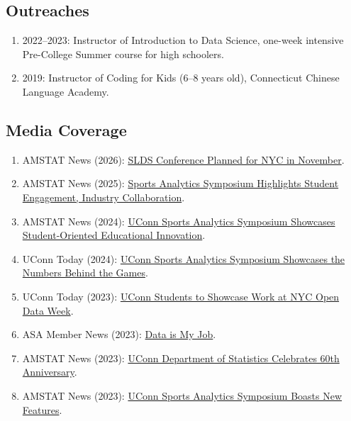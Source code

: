 \documentclass[Statistics]{vita}
\begin{document}
\begin{vita}
  \subsection{Outreaches}
  \begin{enumerate}
  \item 2022--2023: Instructor of Introduction to Data Science, one-week intensive Pre-College Summer course for high schoolers.
  \item 2019: Instructor of Coding for Kids (6--8 years old), Connecticut  Chinese Language Academy.
  \end{enumerate}
  \subsection{Media Coverage}
  \begin{enumerate}
  \item AMSTAT News (2026): 
\href{https://magazine.amstat.org/blog/2026/01/01/slds-2026/}{SLDS Conference Planned for NYC in November}.
  \item AMSTAT News (2025): \href{https://magazine.amstat.org/blog/2025/11/03/csas-2025/}{Sports Analytics Symposium Highlights Student Engagement, Industry Collaboration}.
  \item AMSTAT News (2024): \href{https://magazine.amstat.org/blog/2024/11/05/uconn-ucsas-2024/}{UConn Sports Analytics Symposium Showcases Student-Oriented Educational Innovation}.
  \item UConn Today (2024): \href{https://today.uconn.edu/2024/04/uconn-sports-analytics-symposium-returns-for-fifth-time/}{UConn Sports Analytics Symposium Showcases the Numbers Behind the Games}.
  \item UConn Today (2023): \href{https://today.uconn.edu/2023/03/uconn-students-to-showcase-work-at-nyc-open-data-week/}{UConn Students to Showcase Work at NYC Open Data Week}.
  \item ASA Member News (2023): \href{https://www.amstat.org/docs/default-source/amstat-documents/data-is-my-job-poster.pdf}{Data is My Job}.
  \item AMSTAT News (2023): \href{https://magazine.amstat.org/blog/2023/02/01/uconn-stats-dept-anniversary/}{UConn Department of Statistics Celebrates 60th Anniversary}.
  \item AMSTAT News (2023): \href{https://magazine.amstat.org/blog/2023/01/02/uconn-sports-analytics-symposium/}{UConn Sports Analytics Symposium Boasts New Features}.

\end{enumerate}
\end{vita}
\end{document}
